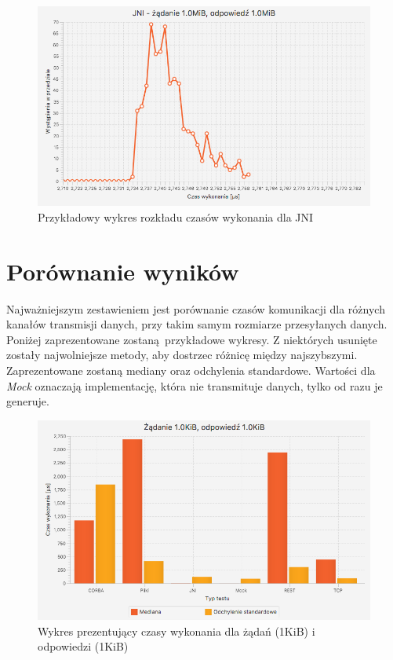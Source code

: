 \begin{figure}[H]
    \centering
    \includegraphics[scale=0.38]{img/charts/JNI_chart_1048576_1048576.png}
    \caption{Przykładowy wykres rozkładu czasów wykonania dla JNI}
\end{figure}


\section{Porównanie wyników}

Najważniejszym zestawieniem jest porównanie czasów komunikacji dla różnych kanałów transmisji danych, przy takim samym rozmiarze przesyłanych danych. Poniżej zaprezentowane zostaną przykładowe wykresy. Z niektórych usunięte zostały najwolniejsze metody, aby dostrzec różnicę między najszybszymi. Zaprezentowane zostaną mediany oraz odchylenia standardowe. Wartości dla \textit{Mock} oznaczają implementację, która nie transmituje danych, tylko od razu je generuje.


\begin{figure}[H]
    \centering
    \includegraphics[scale=0.38]{img/charts/chart_1024_1024.png}
    \caption{Wykres prezentujący czasy wykonania dla żądań (1KiB) i odpowiedzi (1KiB)}
    \label{fig:chart_1024_1024}
\end{figure}

